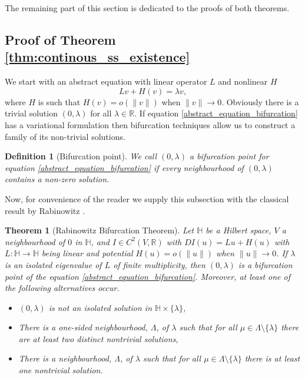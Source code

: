 \documentclass[12pt, a4paper]{article}
\theoremstyle{break}
\newtheorem{thm}{Theorem}[section]
\theoremstyle{break}
\theoremstyle{break}
\theoremstyle{break}
\theoremstyle{break}
\newtheorem{defi}{Definition}[section]
\begin{document}
The remaining part of this section is dedicated to the proofs of both theorems.

\subsection{Proof of Theorem \ref{thm:continous_ss_existence}}

We start with an abstract equation with linear operator $L$ and nonlinear $H$
\begin{equation}
    L v + H(v) = \lambda v,
    \label{abstract_equation_bifurcation}
\end{equation}
where $H$ is such that $H(v) = o(\|v\|)$ when $\|v\| \rightarrow 0$. Obviously there is a trivial solution $(0, \lambda)$ for all $\lambda \in \mathbb{R}$. If equation \eqref{abstract_equation_bifurcation} has a variational formulation then bifurcation techniques allow us to construct a family of its non-trivial solutions.

\begin{defi}[Bifurcation point]
    We call $(0, \lambda)$ a bifurcation point for equation \eqref{abstract_equation_bifurcation} if every neighbourhood of $(0, \lambda)$ contains a non-zero solution.
    \label{def:bifurcation_point}
\end{defi}

Now, for convenience of the reader we supply this subsection with the classical result by Rabinowitz \cite{Rabinowitz1977}.

\begin{thm}[Rabinowitz Bifurcation Theorem]
    Let $\mathbb{H}$ be a Hilbert space, $V$ a neighbourhood of $0$ in $\mathbb{H}$, and $I \in C^2\left(V, \mathbb{R}\right)$ with $DI(u) = Lu + H(u)$ with $L: \mathbb{H} \rightarrow \mathbb{H}$ being linear and potential $H(u) = o(\|u\|)$ when $\|u\| \rightarrow 0$. If $\lambda$ is an isolated eigenvalue of $L$ of finite multiplicity, then $(0, \lambda)$ is a bifurcation point of the equation \eqref{abstract_equation_bifurcation}.
    Moreover, at least one of the following alternatives occur.
    \begin{itemize}
        \item [(i)] $(0, \lambda)$ is not an isolated solution in $\mathbb{H} \times \{\lambda\} $,
        \item [(ii)] There is a one-sided neighbourhood, $\Lambda$, of $\lambda$ such that for all $\mu \in \Lambda \setminus \{\lambda\}$ there are at least two distinct nontrivial solutions,
        \item [(iii)] There is a neighbourhood, $\Lambda$, of $\lambda$ such that for all $\mu \in \Lambda \setminus \{\lambda\}$ there is at least one nontrivial solution.
    \end{itemize}
    \label{thm:rabinowitz_bifurcation}
\end{thm}
\end{document}
